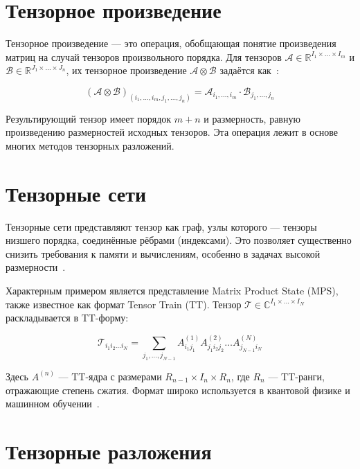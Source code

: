 \section*{Тензорное произведение}
\label{sec:tensor_product}

Тензорное произведение — это операция, обобщающая понятие произведения матриц на случай тензоров произвольного порядка. Для тензоров \( \mathcal{A} \in \mathbb{R}^{I_1 \times \dots \times I_m} \) и \( \mathcal{B} \in \mathbb{R}^{J_1 \times \dots \times J_n} \), их тензорное произведение \( \mathcal{A} \otimes \mathcal{B} \) задаётся как~\cite{sparse_tensor}:

\begin{equation}
\label{eq:tensor_product}
(\mathcal{A} \otimes \mathcal{B})_{(i_1, \dots, i_m, j_1, \dots, j_n)} = \mathcal{A}_{i_1, \dots, i_m} \cdot \mathcal{B}_{j_1, \dots, j_n}
\end{equation}

Результирующий тензор имеет порядок \(m+n\) и размерность, равную произведению размерностей исходных тензоров. Эта операция лежит в основе многих методов тензорных разложений.

\section*{Тензорные сети}
\label{sec:tensor_networks}

Тензорные сети представляют тензор как граф, узлы которого — тензоры низшего порядка, соединённые рёбрами (индексами). Это позволяет существенно снизить требования к памяти и вычислениям, особенно в задачах высокой размерности~\cite{curse_of_dim}.

Характерным примером является представление Matrix Product State (MPS), также известное как формат Tensor Train (TT). Тензор \( \mathcal{T} \in \mathbb{C}^{I_1 \times \dots \times I_N} \) раскладывается в TT-форму:

\begin{equation}
\label{eq:mps}
\mathcal{T}_{i_1 i_2 \dots i_N} = \sum_{j_1,\dots,j_{N-1}} A^{(1)}_{i_1 j_1} A^{(2)}_{j_1 i_2 j_2} \dots A^{(N)}_{j_{N-1} i_N}
\end{equation}

Здесь \( A^{(n)} \) — TT-ядра с размерами \( R_{n-1} \times I_n \times R_n \), где \( R_n \) — TT-ранги, отражающие степень сжатия. Формат широко используется в квантовой физике и машинном обучении~\cite{dmrg, stable_low_rank_tensor_decomposition}.

\section*{Тензорные разложения}
\label{sec:tensor_decomposition}

